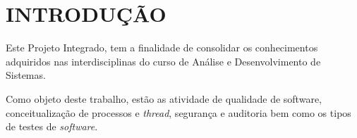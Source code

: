 
\chapter{INTRODUÇÃO}
\label{chap:introducao}

Este Projeto Integrado, tem a finalidade de consolidar os conhecimentos adquiridos nas interdisciplinas do curso de Análise e Desenvolvimento de Sistemas.

Como objeto deste trabalho, estão as atividade de qualidade de software, conceitualização de processos e \textit{thread}, segurança e auditoria bem como os tipos de testes de \textit{software}.
